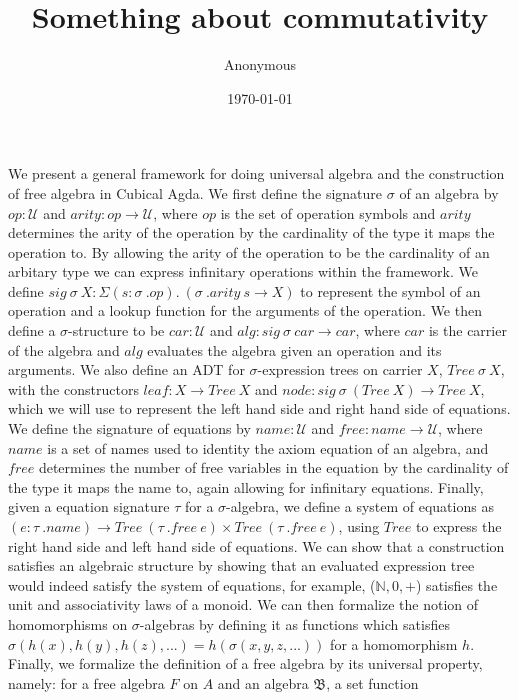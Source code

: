 \documentclass{article}
\title{Something about commutativity}
\author{Anonymous}
\date{\today}
\begin{document}
\maketitle

We present a general framework for doing universal algebra and the construction of
free algebra in Cubical Agda. We first define the signature $\sigma$ of an algebra by $op : \mathcal{U}$ and
$arity : op \rightarrow \mathcal{U}$, where $op$ is the set of operation symbols and $arity$ determines
the arity of the operation by the cardinality of the type it maps the operation to. By allowing the arity
of the operation to be the cardinality of an arbitary type we can express infinitary operations within the framework.
We define $sig \: \sigma \: X : \Sigma( s : \sigma \: .op ). \: (\sigma \: .arity \: s \rightarrow X)$ to represent
the symbol of an operation and a lookup function for the arguments of the operation.
We then define a $\sigma$-structure to be $car : \mathcal{U}$ and $alg : sig \: \sigma \: car \rightarrow car$, where $car$
is the carrier of the algebra and $alg$ evaluates the algebra given an operation and its arguments. We also
define an ADT for $\sigma$-expression trees on carrier $X$, $Tree \: \sigma \: X$,
with the constructors $leaf : X \rightarrow Tree \: X$ and
$node : sig \: \sigma \: (Tree \: X) \rightarrow Tree \: X$, which we will use to represent
the left hand side and right hand side of equations. We define the signature of equations by 
$name : \mathcal{U}$ and $free : name \rightarrow \mathcal{U}$, where $name$ is a set of names used to identity
the axiom equation of an algebra, and $free$ determines the number of free variables in the equation by the
cardinality of the type it maps the name to, again allowing for infinitary equations. Finally, given a
equation signature $\tau$ for a $\sigma$-algebra, we define a system of equations as
$(e : \tau \: .name) \rightarrow Tree \: (\tau \: .free \: e) \times Tree \: (\tau \: .free \: e)$, using $Tree$
to express the right hand side and left hand side of equations.
We can show that a construction satisfies an algebraic structure by showing that an evaluated expression
tree would indeed satisfy the system of equations, for example, ($\mathbb{N},0,+$) satisfies the
unit and associativity laws of a monoid. We can then formalize the notion of homomorphisms on $\sigma$-algebras by 
defining it as functions which satisfies $\sigma(h(x),h(y),h(z),...) = h(\sigma(x,y,z,...))$ for
a homomorphism $h$. Finally, we formalize the definition of a free algebra
by its universal property, namely: for a free algebra $F$ on $A$ and an algebra $\mathfrak{B}$, a set function 
\end{document}
